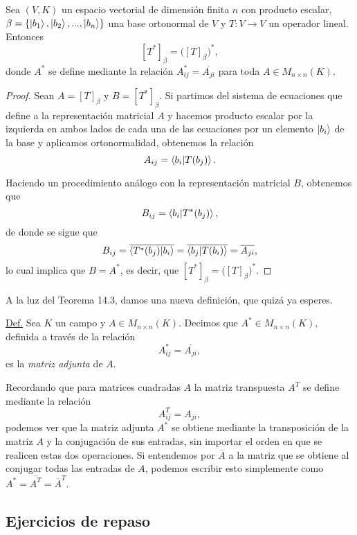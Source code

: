 \documentclass[12pt,dvipsnames]{article}
\newenvironment{teorema}[2][Teorema]{\begin{trivlist}
\item[\hskip \labelsep {\bfseries #1}\hskip \labelsep {\bfseries #2.}]}{\end{trivlist}}
\begin{document}
\begin{teorema} {14.3}
Sea $(V,K)$ un espacio vectorial de dimensión finita $n$ con producto escalar, $\beta=\{\ket{b_1},\ket{b_2},...,\ket{b_n}\}$ una base ortonormal de $V$ y $T:V\to V$ un operador lineal. Entonces $$[T^*]_\beta=\big([T]_\beta\big)^*,$$ donde $A^*$ se define mediante la relación $A^*_{ij}=\overline{A_{ji}}$ para toda $A\in M_{n\times n}(K)$.
\begin{proof}
Sean $A=[T]_\beta$ y $B=[T^*]_\beta$. Si partimos del sistema de ecuaciones que define a la representación matricial $A$ y hacemos producto escalar por la izquierda en ambos lados de cada una de las ecuaciones por un elemento $\ket{b_i}$ de la base y aplicamos ortonormalidad, obtenemos la relación $$A_{ij}=\braket{b_i|T(b_j)}.$$ 

Haciendo un procedimiento análogo con la representación matricial $B$, obtenemos que $$B_{ij}=\braket{b_i|T^*(b_j)},$$ de donde se sigue que $$B_{ij}=\overline{\braket{T^*(b_j)|b_i}}=\overline{\braket{b_j|T(b_i)}}=\overline{A_{ji}},$$ lo cual implica que $B=A^*$, es decir, que $[T^*]_\beta=\big([T]_\beta\big)^*$.
\end{proof}
\end{teorema}

A la luz del Teorema 14.3, damos una nueva definición, que quizá ya esperes.

\vspace{5mm}
\begin{tcolorbox}
\underline{Def.} Sea $K$ un campo y $A\in M_{n\times n}(K)$. Decimos que $A^*\in M_{n\times n}(K)$, definida a través de la relación $$A^*_{ij}=\overline{A_{ji}},$$ es la \emph{matriz adjunta} de $A$.
\end{tcolorbox}
\vspace{5mm}

\noindent Recordando que para matrices cuadradas $A$ la matriz transpuesta $A^T$ se define mediante la relación $$A^T_{ij}=A_{ji},$$ podemos ver que la matriz adjunta $A^*$ se obtiene mediante la transposición de la matriz $A$ y la conjugación de sus entradas, sin importar el orden en que se realicen estas dos operaciones. Si entendemos por $\overline{A}$ a la matriz que se obtiene al conjugar todas las entradas de $A$, podemos escribir esto simplemente como $A^*=\overline{A^T}=\overline{A}^T$.

\subsection{Ejercicios de repaso}
\end{document}
